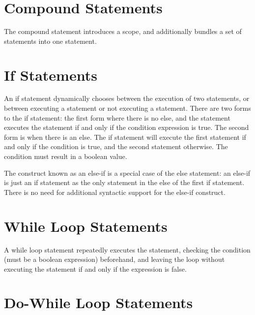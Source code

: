 \documentclass[letterpaper,12pt]{book}
\begin{document}
\section{Compound Statements}



The compound statement introduces a scope, and additionally bundles a set of statements into one statement.

\section{If Statements}



An if statement dynamically chooses between the execution of two statements, or between executing a statement or not executing a statement. There are two forms to the if statement: the first form where there is no else, and the statement executes the statement if and only if the condition expression is true. The second form is when there is an else. The if statement will execute the first statement if and only if the condition is true, and the second statement otherwise. The condition must result in a boolean value.

The construct known as an else-if is a special case of the else statement: an else-if is just an if statement as the only statement in the else of the first if statement. There is no need for additional syntactic support for the else-if construct.

\section{While Loop Statements}



A while loop statement repeatedly executes the statement, checking the condition (must be a boolean expression) beforehand, and leaving the loop without executing the statement if and only if the expression is false.

\section{Do-While Loop Statements}


\end{document}
